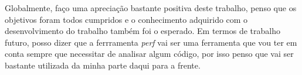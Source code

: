 \documentclass[conference,compsoc]{IEEEtran}
\begin{document}
Globalmente, faço uma apreciação bastante positiva deste trabalho, penso que os objetivos foram todos cumpridos e o conhecimento adquirido com o desenvolvimento do trabalho também foi o esperado. Em termos de trabalho futuro, posso dizer que a ferrramenta \textit{perf} vai ser uma ferramenta que vou ter em conta sempre que necessitar de analisar algum código, por isso penso que vai ser bastante utilizada da minha parte daqui para a frente.
%
%



%
%
\end{document}
